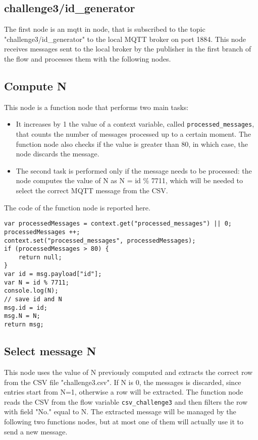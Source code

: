 \subsection{challenge3/id\_generator}
The first node is an mqtt in node, that is subscribed to the topic "challenge3/id\_generator" to the local MQTT broker on port 1884. This node receives messages sent to the local broker by the publisher in the first branch of the flow and processes them with the following nodes.

\subsection{Compute N}
This node is a function node that performs two main tasks:
\begin{itemize}
\item It increases by 1 the value of a context variable, called \verb|processed_messages|, that counts the number of messages processed up to a certain moment. The function node also checks if the value is greater than 80, in which case, the node discards the message.
\item The second task is performed only if the message needs to be processed: the node computes the value of N as N = id \% 7711, which will be needed to select the correct MQTT message from the CSV.
\end{itemize}

The code of the function node is reported here.
\begin{verbatim}
var processedMessages = context.get("processed_messages") || 0;
processedMessages ++;
context.set("processed_messages", processedMessages);
if (processedMessages > 80) {
    return null;
}
var id = msg.payload["id"];
var N = id % 7711;
console.log(N);
// save id and N
msg.id = id;
msg.N = N;
return msg;
\end{verbatim}

\subsection{Select message N}
This node uses the value of N previously computed and extracts the correct row from the CSV file "challenge3.csv". If N is 0, the messages is discarded, since entries start from N=1, otherwise a row will be extracted. The function node reads the CSV from the flow variable \verb|csv_challenge3| and then filters the row with field "No." equal to N. The extracted message will be managed by the following two functions nodes, but at most one of them will actually use it to send a new message.


